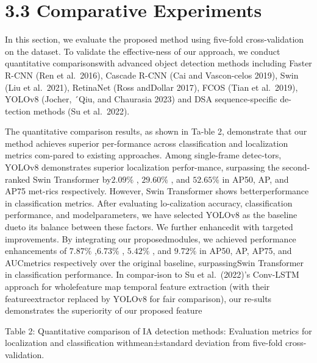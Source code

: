 \documentclass[
  10
]{article}
\begin{document}
\section{3.3 Comparative Experiments}\label{comparative-experiments}

In this section, we evaluate the proposed method using five-fold
cross-validation on the dataset. To validate the effective-ness of our
approach, we conduct quantitative comparisonswith advanced object
detection methods including Faster R-CNN (Ren et al.~2016), Cascade
R-CNN (Cai and Vascon-celos 2019), Swin (Liu et al.~2021), RetinaNet
(Ross andDollar 2017), FCOS (Tian et al.~2019), YOLOv8 (Jocher, ´Qiu,
and Chaurasia 2023) and DSA sequence-specific de-tection methods (Su et
al.~2022).

The quantitative comparison results, as shown in Ta-ble 2, demonstrate
that our method achieves superior per-formance across classification and
localization metrics com-pared to existing approaches. Among
single-frame detec-tors, YOLOv8 demonstrates superior localization
perfor-mance, surpassing the second-ranked Swin Transformer
by\(2 . 0 9 \%\) , \(2 9 . 6 0 \%\) , and \(5 2 . 6 5 \%\) in AP50, AP,
and AP75 met-rics respectively. However, Swin Transformer shows
betterperformance in classification metrics. After evaluating
lo-calization accuracy, classification performance, and modelparameters,
we have selected YOLOv8 as the baseline dueto its balance between these
factors. We further enhancedit with targeted improvements. By
integrating our proposedmodules, we achieved performance enhancements of
\(7 . 8 7 \%\) ,\(6 . 7 3 \%\) , \(5 . 4 2 \%\) , and \(9 . 7 2 \%\) in
AP50, AP, AP75, and AUCmetrics respectively over the original baseline,
surpassingSwin Transformer in classification performance. In compar-ison
to Su et al.~(2022)'s Conv-LSTM approach for wholefeature map temporal
feature extraction (with their featureextractor replaced by YOLOv8 for
fair comparison), our re-sults demonstrates the superiority of our
proposed feature

Table 2: Quantitative comparison of IA detection methods: Evaluation
metrics for localization and classification withmean±standard deviation
from five-fold cross-validation.
\end{document}
